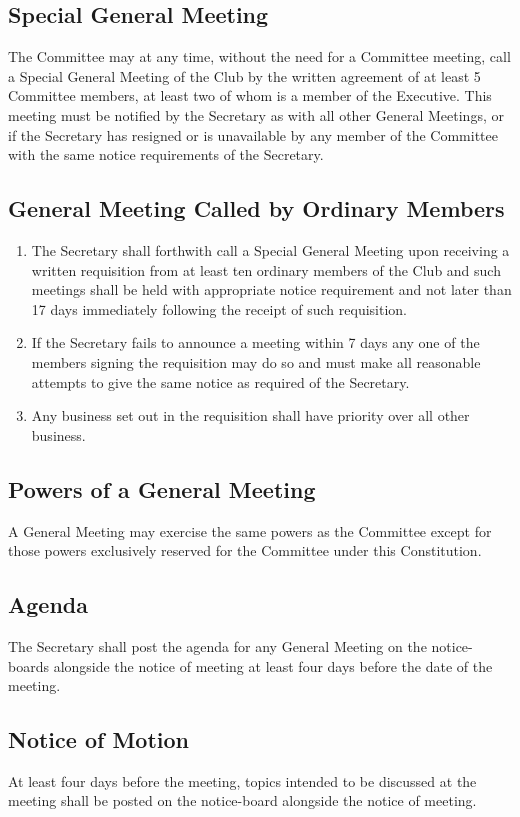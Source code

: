 \documentclass[11pt]{article} %
\begin{document}
\subsection{Special General Meeting}
The Committee may at any time, without the need for a Committee meeting, call a Special General Meeting of the Club by the written agreement of at least 5 Committee members, at least two of whom is a member of the Executive. This meeting must be notified by the Secretary as with all other General Meetings, or if the Secretary has resigned or is unavailable by any member of the Committee with the same notice requirements of the Secretary.\\

\subsection{General Meeting Called by Ordinary Members}
\begin{enumerate}
	\item The Secretary shall forthwith call a Special General Meeting upon receiving a written requisition from at least ten ordinary members of the Club and such meetings shall be held with appropriate notice requirement and not later than 17 days immediately following the receipt of such requisition.
	\item If the Secretary fails to announce a meeting within 7 days any one of the members signing the requisition may do so and must make all reasonable attempts to give the same notice as required of the Secretary.
	\item Any business set out in the requisition shall have priority over all other business.
\end{enumerate}

\subsection{Powers of a General Meeting}
A General Meeting may exercise the same powers as the Committee except for those powers exclusively reserved for the Committee under this Constitution.
\subsection{Agenda}
The Secretary shall post the agenda for any General Meeting on the notice-boards alongside the notice of meeting at least four days before the date of the meeting.

\subsection{Notice of Motion}
At least four days before the meeting, topics intended to be discussed at the meeting shall be posted on the notice-board alongside the notice of meeting.
\end{document}

